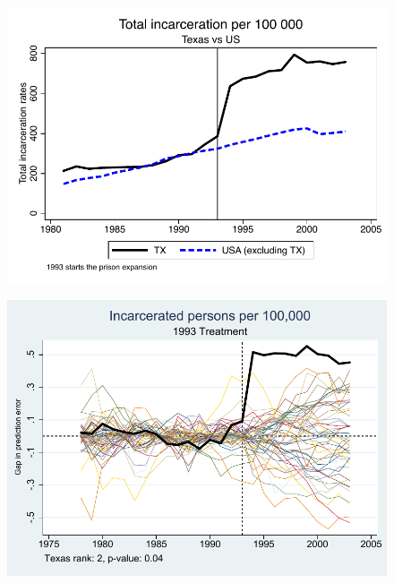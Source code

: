 \documentclass{beamer}
\begin{document}
\begin{frame}[shrink=30,plain]

\begin{figure}
\includegraphics{./lecture_includes/total_incarceration.pdf}
\end{figure}
\end{frame}

\begin{frame}[shrink=30,plain]

\begin{figure}
\includegraphics{./lecture_includes/synth_placebo_totalincarceration1993.pdf}
\end{figure}
\end{frame}
\end{document}
